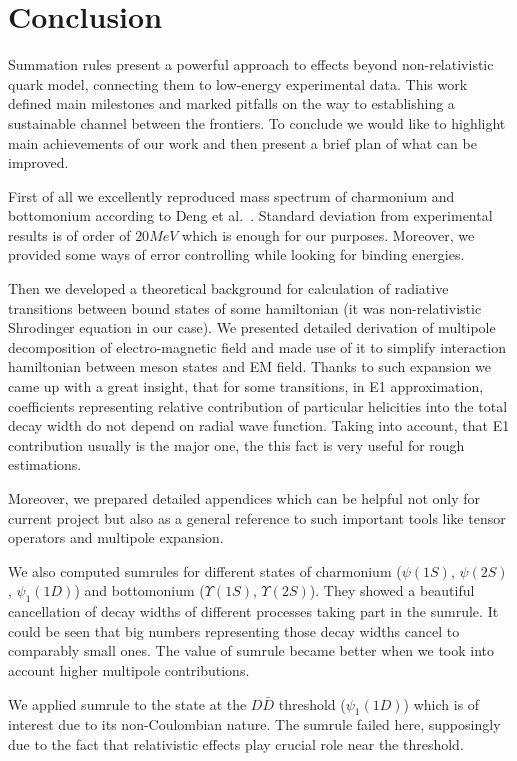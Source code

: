 \chapter{Conclusion}

Summation rules present a powerful approach to effects beyond non-relativistic quark model, connecting them to low-energy experimental data. This work defined main milestones and marked pitfalls on the way to establishing a sustainable channel between the frontiers. To conclude we would like to highlight main achievements of our work and then present a brief plan of what can be improved.

First of all we excellently reproduced mass spectrum of charmonium and bottomonium according to Deng et al.~\cite{deng-bot,deng-charm}. Standard deviation from experimental results is of order of $20MeV$ which is enough for our purposes. Moreover, we provided some ways of error controlling while looking for binding energies.

Then we developed a theoretical background for calculation of radiative transitions between bound states of some hamiltonian (it was non-relativistic Shrodinger equation in our case). We presented detailed derivation of multipole decomposition of electro-magnetic field and made use of it to simplify interaction hamiltonian between meson states and EM field. Thanks to such expansion we came up with a great insight, that for some transitions, in E1 approximation, coefficients representing relative contribution of particular helicities into the total decay width do not depend on radial wave function. Taking into account, that E1 contribution usually is the major one, the this fact is very useful for rough estimations.

Moreover, we prepared detailed appendices which can be helpful not only for current project but also as a general reference to such important tools like tensor operators and multipole expansion.

We also computed sumrules for different states of charmonium ($\psi(1S)$, $\psi(2S)$, $\psi_1(1D)$) and bottomonium ($\Upsilon(1S)$, $\Upsilon(2S)$). They showed a beautiful cancellation of decay widths of different processes taking part in the sumrule. It could be seen that big numbers representing those decay widths cancel to comparably small ones. The value of sumrule became better when we took into account higher multipole contributions.

We applied sumrule to the state at the $D\bar{D}$ threshold ($\psi_1(1D)$) which is of interest due to its non-Coulombian nature. The sumrule failed here, supposingly due to the fact that relativistic effects play crucial role near the threshold.

